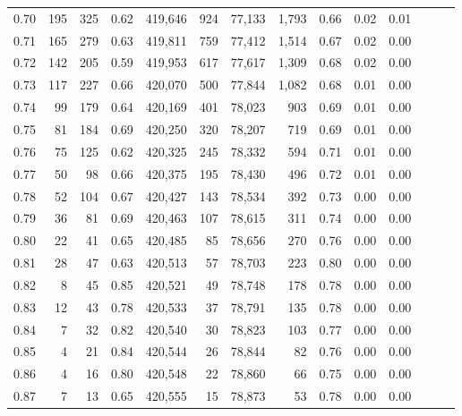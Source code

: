 \begin{tabular}{rrrrrrrrrrrrrr}
0.70 &     195 &    325 &  0.62 &  419,646 &      924 &  77,133 &   1,793 &  0.66 &  0.02 &      0.01 \\
0.71 &     165 &    279 &  0.63 &  419,811 &      759 &  77,412 &   1,514 &  0.67 &  0.02 &      0.00 \\
0.72 &     142 &    205 &  0.59 &  419,953 &      617 &  77,617 &   1,309 &  0.68 &  0.02 &      0.00 \\
0.73 &     117 &    227 &  0.66 &  420,070 &      500 &  77,844 &   1,082 &  0.68 &  0.01 &      0.00 \\
0.74 &      99 &    179 &  0.64 &  420,169 &      401 &  78,023 &     903 &  0.69 &  0.01 &      0.00 \\
0.75 &      81 &    184 &  0.69 &  420,250 &      320 &  78,207 &     719 &  0.69 &  0.01 &      0.00 \\
0.76 &      75 &    125 &  0.62 &  420,325 &      245 &  78,332 &     594 &  0.71 &  0.01 &      0.00 \\
0.77 &      50 &     98 &  0.66 &  420,375 &      195 &  78,430 &     496 &  0.72 &  0.01 &      0.00 \\
0.78 &      52 &    104 &  0.67 &  420,427 &      143 &  78,534 &     392 &  0.73 &  0.00 &      0.00 \\
0.79 &      36 &     81 &  0.69 &  420,463 &      107 &  78,615 &     311 &  0.74 &  0.00 &      0.00 \\
0.80 &      22 &     41 &  0.65 &  420,485 &       85 &  78,656 &     270 &  0.76 &  0.00 &      0.00 \\
0.81 &      28 &     47 &  0.63 &  420,513 &       57 &  78,703 &     223 &  0.80 &  0.00 &      0.00 \\
0.82 &       8 &     45 &  0.85 &  420,521 &       49 &  78,748 &     178 &  0.78 &  0.00 &      0.00 \\
0.83 &      12 &     43 &  0.78 &  420,533 &       37 &  78,791 &     135 &  0.78 &  0.00 &      0.00 \\
0.84 &       7 &     32 &  0.82 &  420,540 &       30 &  78,823 &     103 &  0.77 &  0.00 &      0.00 \\
0.85 &       4 &     21 &  0.84 &  420,544 &       26 &  78,844 &      82 &  0.76 &  0.00 &      0.00 \\
0.86 &       4 &     16 &  0.80 &  420,548 &       22 &  78,860 &      66 &  0.75 &  0.00 &      0.00 \\
0.87 &       7 &     13 &  0.65 &  420,555 &       15 &  78,873 &      53 &  0.78 &  0.00 &      0.00 \\

\end{tabular}
